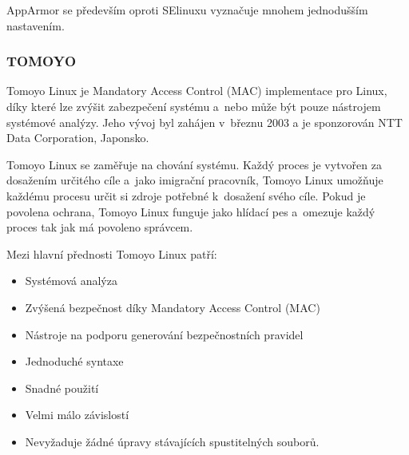 \documentclass[a4paper,12pt]{article}
\begin{document}
AppArmor se především oproti SElinuxu vyznačuje mnohem jednodušším nastavením.

\subsubsection{TOMOYO}
Tomoyo Linux je Mandatory Access Control (MAC) implementace pro Linux, díky které lze zvýšit zabezpečení systému a~nebo může být pouze nástrojem systémové analýzy. Jeho vývoj byl zahájen v~březnu 2003 a je sponzorován NTT Data Corporation, Japonsko.

Tomoyo Linux se zaměřuje na chování systému. Každý proces je vytvořen za dosažením určitého cíle a~jako imigrační pracovník, Tomoyo Linux umožňuje každému procesu určit si zdroje potřebné k~dosažení svého cíle. Pokud je povolena ochrana, Tomoyo Linux funguje jako hlídací pes a~omezuje každý proces tak jak má povoleno správcem.\cite{TOMOYOLinuxHOME}

Mezi hlavní přednosti Tomoyo Linux patří:
\begin{itemize}
 \item Systémová analýza
 \item Zvýšená bezpečnost díky Mandatory Access Control (MAC)
 \item Nástroje na podporu generování bezpečnostních pravidel
 \item Jednoduché syntaxe
 \item Snadné použití
 \item Velmi málo závislostí
 \item Nevyžaduje žádné úpravy stávajících spustitelných souborů.
\end{itemize}

\end{document}
